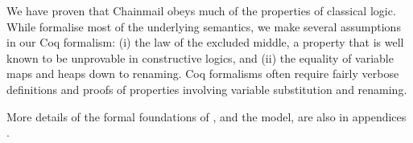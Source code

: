We have proven that Chainmail obeys much of the properties of classical logic. While formalise most of the underlying semantics, we make several assumptions in our Coq formalism: (i) the law of the excluded middle,  a property that is well known to be unprovable in constructive logics, and (ii) the equality of variable maps and heaps down to renaming. Coq formalisms often require fairly verbose definitions and proofs of properties involving variable substitution and renaming.

More details of the formal foundations of \Chainmail, and the model,
are also in appendices \cite{examples}.

